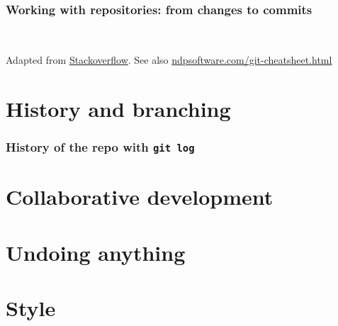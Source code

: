 \documentclass[10pt,svgnames,handout]{beamer}
\begin{document}
\begin{frame}
\frametitle{Working with repositories: from changes to commits}
\\
\begin{small}
Adapted from \href{https://tex.stackexchange.com/a/70332/14260}{Stackoverflow}. See also \href{http://ndpsoftware.com/git-cheatsheet.html}{ndpsoftware.com/git-cheatsheet.html}
\end{small}

\end{frame}



\section{History and branching}

\begin{frame}
\frametitle{History of the repo with \lstinline{git log}}



\end{frame}






\section{Collaborative development}


\section{Undoing anything}


\section{Style}
\end{document}
